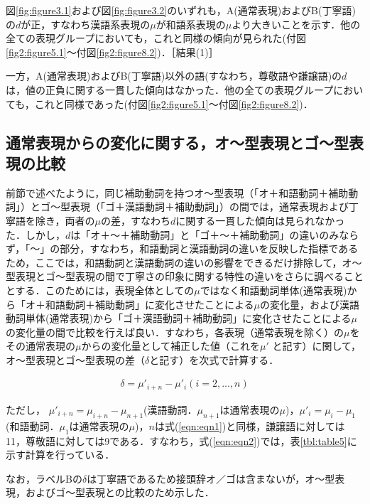 図\ref{fig:figure3.1}および図\ref{fig:figure3.2}のいずれも，A(通常表現)およびB(丁寧語)の$d$が正，すなわち漢語系表現の$\mu$が和語系表現の$\mu$より大きいことを示す．他の全ての表現グループにおいても，これと同様の傾向が見られた(付図\ref{fig2:figure5.1}〜付図\ref{fig2:figure8.2})．［結果(1)］

一方，A(通常表現)およびB(丁寧語)以外の語(すなわち，尊敬語や謙譲語)の$d$は，値の正負に関する一貫した傾向はなかった．他の全ての表現グループにおいても，これと同様であった(付図\ref{fig2:figure5.1}〜付図\ref{fig2:figure8.2})．

\subsection{通常表現からの変化に関する，オ〜型表現とゴ〜型表現の比較} \label{sc:5.2}

前節で述べたように，同じ補助動詞を持つオ〜型表現（「オ＋和語動詞＋補助動詞」）とゴ〜型表現（「ゴ＋漢語動詞＋補助動詞」）の間では，通常表現および丁寧語を除き，両者の$\mu$の差，すなわち$d$に関する一貫した傾向は見られなかった．しかし，$d$は「オ＋〜＋補助動詞」と「ゴ＋〜＋補助動詞」の違いのみならず，「〜」の部分，すなわち，和語動詞と漢語動詞の違いを反映した指標であるため，ここでは，和語動詞と漢語動詞の違いの影響をできるだけ排除して，オ〜型表現とゴ〜型表現の間で丁寧さの印象に関する特性の違いをさらに調べることとする．このためには，表現全体としての$\mu$ではなく和語動詞単体(通常表現)から「オ＋和語動詞＋補助動詞」に変化させたことによる$\mu$の変化量，および漢語動詞単体(通常表現)から「ゴ＋漢語動詞＋補助動詞」に変化させたことによる$\mu$の変化量の間で比較を行えば良い．すなわち，各表現（通常表現を除く）の$\mu$をその通常表現の$\mu$からの変化量として補正した値（これを$\mu'$ と記す）に関して，オ〜型表現とゴ〜型表現の差（$\delta$と記す）を次式で計算する．

\begin{eqnarray}
\delta=\mu'_{i+n}-\mu'_{i}　(i=2,...,n) \label{eqn:eqn2}
\end{eqnarray}

ただし， $\mu'_{i+n}=\mu_{i+n}-\mu_{n+1}$(漢語動詞．$\mu_{n+1}$は通常表現の$\mu$)，$\mu'_{i}=\mu_{i}-\mu_{1}$(和語動詞．$\mu_{1}$は通常表現の$\mu$)，$n$は式(\ref{eqn:eqn1})と同様，謙譲語に対しては11，尊敬語に対しては9である．すなわち，式(\ref{eqn:eqn2})では，表\ref{tbl:table5}に示す計算を行っている．

なお，ラベルBの$\delta$は丁寧語であるため接頭辞オ／ゴは含まないが，オ〜型表現，およびゴ〜型表現との比較のため示した．


